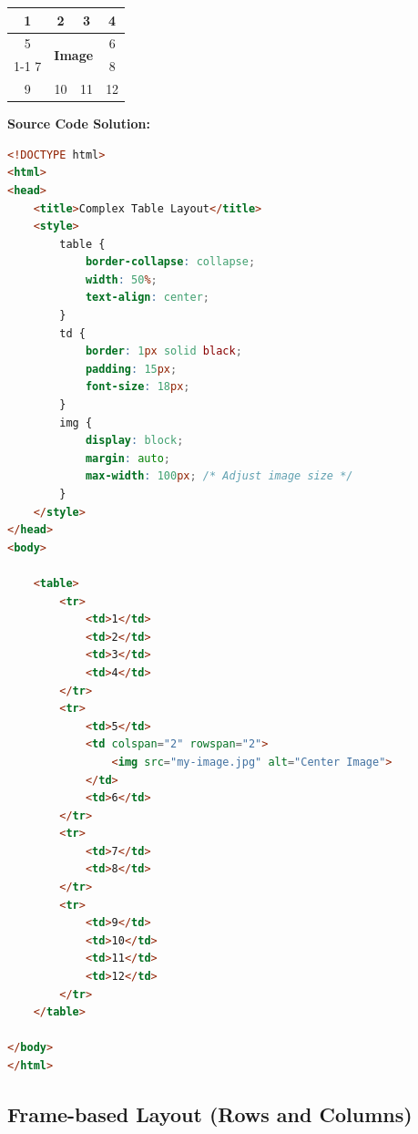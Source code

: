 \documentclass[a4paper,12pt]{article}
\begin{document}
\begin{center}
\renewcommand{\arraystretch}{1.5} %
\begin{tabular}{|c|c|c|c|}
\hline
1 & 2 & 3 & 4 \\ \hline
5 & \multicolumn{2}{c|}{\multirow{2}{*}{\textbf{Image}}} & 6 \\ \cline{1-1} \cline{4-4} 
7 & \multicolumn{2}{c|}{} & 8 \\ \hline
9 & 10 & 11 & 12 \\ \hline
\end{tabular}
\end{center}

\vspace{0.5cm}
\textbf{Source Code Solution:}

\begin{lstlisting}[language=HTML, caption={HTML Code for Merged Grid}]
<!DOCTYPE html>
<html>
<head>
    <title>Complex Table Layout</title>
    <style>
        table {
            border-collapse: collapse;
            width: 50%;
            text-align: center;
        }
        td {
            border: 1px solid black;
            padding: 15px;
            font-size: 18px;
        }
        img {
            display: block;
            margin: auto;
            max-width: 100px; /* Adjust image size */
        }
    </style>
</head>
<body>

    <table>
        <tr>
            <td>1</td>
            <td>2</td>
            <td>3</td>
            <td>4</td>
        </tr>
        <tr>
            <td>5</td>
            <td colspan="2" rowspan="2">
                <img src="my-image.jpg" alt="Center Image">
            </td>
            <td>6</td>
        </tr>
        <tr>
            <td>7</td>
            <td>8</td>
        </tr>
        <tr>
            <td>9</td>
            <td>10</td>
            <td>11</td>
            <td>12</td>
        </tr>
    </table>

</body>
</html>
\end{lstlisting}
\subsection{Frame-based Layout (Rows and Columns)}
\end{document}

